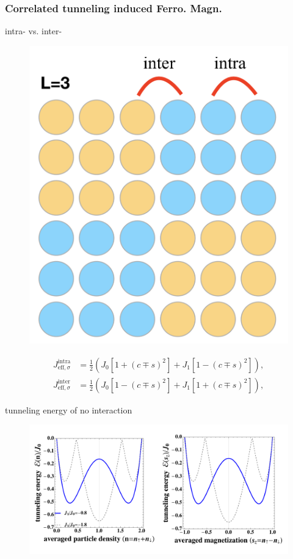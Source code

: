\documentclass[]{beamer}
\begin{document}
\begin{frame}\frametitle{Correlated tunneling induced Ferro. Magn.}
\begin{block}{intra- vs. inter-}
\begin{minipage}{.3\columnwidth}
\begin{figure}
    \centering
    \includegraphics[width=.6\columnwidth]{figs/intra-inter.png}
\end{figure}
\end{minipage}
\begin{minipage}{.65\columnwidth}
\begin{align*}
	J^{\text{intra}}_{\text{eff},\sigma} &= 
        \frac{1}{2} \left(J_0[1+(c\mp s)^2]+J_1[1-(c\mp s)^2]\right), \\
	J^{\text{inter}}_{\text{eff},\sigma} &= 
        \frac{1}{2} \left(J_0[1-(c\mp s)^2]+J_1[1+(c\mp s)^2]\right),
\end{align*}
\end{minipage}
\end{block}
\pause
\vspace{-1ex}
\begin{block}{tunneling energy of no interaction}
\begin{figure}
    \centering
    \includegraphics[width=0.6\columnwidth]{figs/kinetic_energy.pdf}
\end{figure}
\end{block}
\end{frame}
\end{document}
